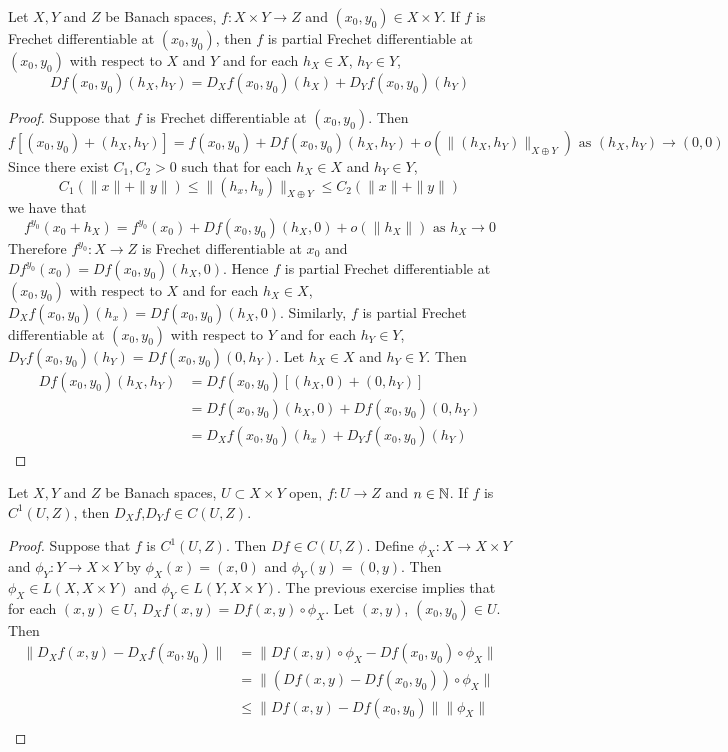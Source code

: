 \documentclass{book}
\begin{document}
	\begin{ex}
		Let $X, Y$ and $Z$ be Banach spaces, $f: X \times Y \rightarrow Z$ and $(x_0, y_0) \in X \times Y$. If $f$ is Frechet differentiable at $(x_0, y_0)$, then $f$ is partial Frechet differentiable at $(x_0, y_0)$ with respect to $X$ and $Y$ and for each $h_X \in X$, $h_Y \in Y$,  
		$$Df(x_0, y_0)(h_X, h_Y) = D_Xf(x_0, y_0) (h_X) + D_Yf(x_0, y_0) (h_Y)$$
	\end{ex}

	\begin{proof}
		Suppose that $f$ is Frechet differentiable at $(x_0, y_0)$. Then 
		$$f[(x_0,y_0) + (h_X, h_Y)] = f(x_0, y_0) + Df(x_0, y_0)(h_X, h_Y) + o(\|(h_X, h_Y)\|_{X \oplus Y}) \text{ as } (h_X, h_Y) \rightarrow (0,0)$$ Since there exist $C_1, C_2 > 0$ such that for each $h_X \in X$ and $h_Y \in Y$, 
		$$C_1(\|x\| + \|y\|) \leq \|(h_x, h_y)\|_{X \oplus Y} \leq C_2(\|x\| + \|y\|)$$
		we have that 
		$$f^{y_0}(x_0 + h_X) = f^{y_0}(x_0) + Df(x_0, y_0)(h_X, 0) + o(\|h_X\|) \text{ as } h_X \rightarrow 0$$
		Therefore $f^{y_0}:X \rightarrow Z$ is Frechet differentiable at $x_0$ and $Df^{y_0}(x_0) = Df(x_0, y_0)(h_X, 0)$. Hence $f$ is partial Frechet differentiable at $(x_0, y_0)$ with respect to $X$ and for each $h_X \in X$, $D_Xf(x_0, y_0)(h_x) = Df(x_0, y_0)(h_X, 0)$. Similarly, $f$ is partial Frechet differentiable at $(x_0, y_0)$ with respect to $Y$ and for each $h_Y \in Y$, $D_Yf(x_0, y_0)(h_Y) = Df(x_0, y_0)(0, h_Y)$. Let $h_X \in X$ and $h_Y \in Y$. Then
		\begin{align*}
			Df(x_0, y_0)(h_X, h_Y) 
			& = Df(x_0, y_0)[(h_X, 0) + (0, h_Y)] \\
			& = Df(x_0, y_0)(h_X, 0) + Df(x_0, y_0)(0, h_Y) \\
			& = D_Xf(x_0, y_0)(h_x) +  D_Yf(x_0, y_0)(h_Y)
		\end{align*}
	\end{proof}

	\begin{ex}
		Let $X, Y$ and $Z$ be Banach spaces, $U \subset X \times Y$ open, $f: U \rightarrow Z$ and $n \in \mathbb{N}$. If $f$ is $C^1(U, Z)$, then $D_Xf$,$D_Yf \in C(U, Z)$.
	\end{ex}

	\begin{proof}
		Suppose that $f$ is $C^1(U, Z)$. Then $Df \in C(U, Z)$. Define $\phi_X:X \rightarrow X \times Y$ and $\phi_Y:Y \rightarrow X \times Y$ by $\phi_X(x) = (x, 0)$ and $\phi_Y(y) = (0, y)$. Then $\phi_X \in L(X, X \times Y)$ and $\phi_Y \in L(Y, X \times Y)$. The previous exercise implies that for each $(x,y) \in U$, $D_Xf(x,y) = Df(x, y) \circ \phi_X $. Let $(x,y)$, $(x_0, y_0) \in U$. Then 
		\begin{align*}
			\|D_Xf(x,y) - D_Xf(x_0, y_0)\|
			& = \|Df(x, y) \circ \phi_X - Df(x_0, y_0) \circ \phi_X\| \\
			& = \|(Df(x, y) - Df(x_0, y_0)) \circ \phi_X\| \\
			& \leq \|Df(x, y) - Df(x_0, y_0) \| \|\phi_X\| \\
		\end{align*}
	\end{proof}
	
\end{document}
